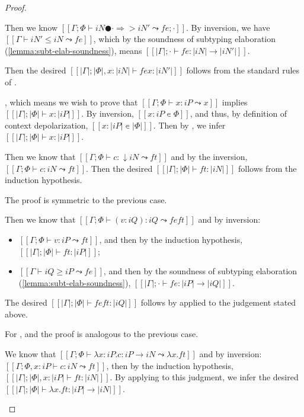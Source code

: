 \begin{proof}
\begin{caseof}
    \item {}
      Then we know $[[Γ ; Φ ⊢ iN ● · ⇒> iN'  ⤳  fe ; ·]]$.
      By inversion, we have $[[Γ ⊢ iN' ≤ iN ⤳ fe]]$, 
      which by the soundness of subtyping elaboration (\cref{lemma:subt-elab-soundness}),
      means $[[|Γ| ; · ⊢ fe : |iN| → |iN'|]]$.

      Then the desired $[[|Γ| ; |Φ|, x:|iN| ⊢ fe x : |iN'|]]$
      follows from the standard rules of \systemf.

    \item {}, 
      which means we wish to prove that  $[[Γ ; Φ ⊢ x : iP ⤳ x]]$
      implies $[[|Γ| ; |Φ| ⊢ x : |iP|]]$.
      By inversion, $[[x : iP ∊ Φ]]$, and thus, 
      by definition of context depolarization, $[[x : |iP| ∊ |Φ|]]$.
      Then by , we infer $[[|Γ| ; |Φ| ⊢ x : |iP|]]$.

    \item {} 
      Then we know that 
      $[[Γ ; Φ ⊢ {c} : ↓iN ⤳ ft]]$ and by the inversion, 
      $[[Γ ; Φ ⊢ c : iN ⤳ ft]]$.
      Then the desired $[[|Γ| ; |Φ| ⊢ ft : |iN|]]$ follows from the induction hypothesis.
    \item {}
      The proof is symmetric to the previous case.
    
    \item {} 
      Then we know that $[[Γ ; Φ ⊢ (v : iQ) : iQ ⤳ fe ft]]$
      and by inversion: 
      \begin{itemize}
        \item $[[Γ ; Φ ⊢ v : iP ⤳ ft]]$, and then by the induction hypothesis,
          $[[|Γ| ; |Φ| ⊢ ft : |iP|]]$;
        \item $[[Γ ⊢ iQ ≥ iP ⤳ fe]]$, and then by the soundness of 
          subtyping elaboration (\cref{lemma:subt-elab-soundness}),
          $[[|Γ| ; · ⊢ fe : |iP| → |iQ|]]$.
      \end{itemize}

      The desired $[[|Γ| ; |Φ| ⊢ fe ft : |iQ|]]$
      follows by  applied to the judgement stated above.

    \item For ,  and 
      the proof is analogous to the previous case.

    \item {}
      We know that $[[Γ ; Φ ⊢ λx:iP . c : iP → iN  ⤳ λx.ft]]$ and by inversion:
      $[[Γ ; Φ, x:iP ⊢ c : iN  ⤳ ft]]$, then by the induction hypothesis,
      $[[|Γ| ; |Φ|, x:|iP| ⊢ ft : |iN|]]$.
      By applying  to this judgment, we infer
      the desired $[[|Γ| ; |Φ| ⊢ λx.ft : |iP| → |iN|]]$.


\end{caseof}
\end{proof}
